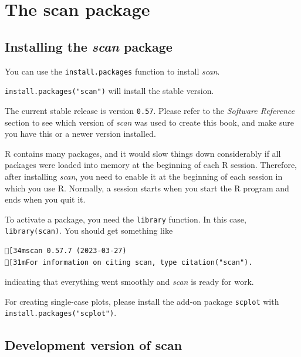 \documentclass[
  letterpaper,
  DIV=11,
  numbers=noendperiod]{scrreprt}
\begin{document}

\hypertarget{the-scan-package}{%
\chapter{The scan package}\label{the-scan-package}}

\hypertarget{installing-the-scan-package}{%
\section{\texorpdfstring{Installing the \emph{scan}
package}{Installing the scan package}}\label{installing-the-scan-package}}

You can use the \texttt{install.packages} function to install
\emph{scan}.

\texttt{install.packages("scan")} will install the stable version.

The current stable release is version \texttt{0.57}. Please refer to the
\emph{Software Reference} section to see which version of \emph{scan}
was used to create this book, and make sure you have this or a newer
version installed.

R contains many packages, and it would slow things down considerably if
all packages were loaded into memory at the beginning of each R session.
Therefore, after installing \emph{scan}, you need to enable it at the
beginning of each session in which you use R. Normally, a session starts
when you start the R program and ends when you quit it.

To activate a package, you need the \texttt{library} function. In this
case, \texttt{library(scan)}. You should get something like

\begin{verbatim}
[34mscan 0.57.7 (2023-03-27)
[31mFor information on citing scan, type citation("scan").
\end{verbatim}

indicating that everything went smoothly and \emph{scan} is ready for
work.

For creating single-case plots, please install the add-on package
\texttt{scplot} with \texttt{install.packages("scplot")}.

\hypertarget{development-version-of-scan}{%
\section{Development version of
scan}\label{development-version-of-scan}}
\end{document}
